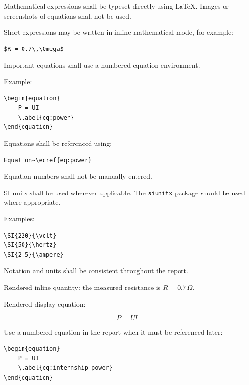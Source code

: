 {\vspace{0.15cm}

Mathematical expressions shall be typeset directly using \LaTeX{}.
Images or screenshots of equations shall not be used.

Short expressions may be written in inline mathematical mode, for example:

\begin{verbatim}
$R = 0.7\,\Omega$
\end{verbatim}

Important equations shall use a numbered equation environment.

Example:

\begin{verbatim}
\begin{equation}
    P = UI
    \label{eq:power}
\end{equation}
\end{verbatim}

Equations shall be referenced using:

\begin{verbatim}
Equation~\eqref{eq:power}
\end{verbatim}

Equation numbers shall not be manually entered.

SI units shall be used wherever applicable. The \verb|siunitx| package
should be used where appropriate.

Examples:

\begin{verbatim}
\SI{220}{\volt}
\SI{50}{\hertz}
\SI{2.5}{\ampere}
\end{verbatim}

Notation and units shall be consistent throughout the report.


\RegExample Rendered inline quantity: the measured resistance is
$R = 0.7\,\Omega$.

\RegExample Rendered display equation:

\begin{equation*}
    P = UI
\end{equation*}

Use a numbered equation in the report when it must be referenced later:

\begin{verbatim}
\begin{equation}
    P = UI
    \label{eq:internship-power}
\end{equation}
\end{verbatim}

}

